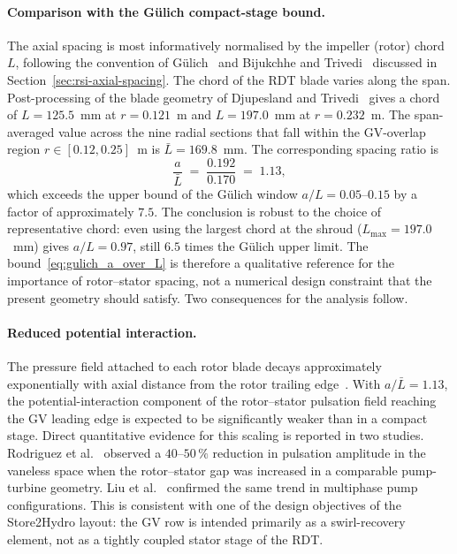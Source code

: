 \paragraph{Comparison with the G\"ulich compact-stage bound.}
The axial spacing is most informatively normalised by the impeller (rotor) chord $L$, following the convention of G\"ulich~\cite{Gulich2010} and Bijukchhe and Trivedi~\cite{Bijukchhe2026} discussed in Section~\ref{sec:rsi-axial-spacing}. The chord of the RDT blade varies along the span. Post-processing of the blade geometry of Djupesland and Trivedi~\cite{DjupeslandTrivedi2025} gives a chord of $L = 125.5$~mm at $r = 0.121$~m and $L = 197.0$~mm at $r = 0.232$~m. The span-averaged value across the nine radial sections that fall within the GV-overlap region $r \in [0.12, 0.25]$~m is $\bar{L} = 169.8$~mm. The corresponding spacing ratio is
\begin{equation}
    \frac{a}{\bar{L}} \;=\; \frac{0.192}{0.170} \;=\; 1.13,
    \label{eq:my_a_over_L}
\end{equation}
which exceeds the upper bound of the G\"ulich window $a/L = 0.05$--$0.15$ by a factor of approximately $7.5$. The conclusion is robust to the choice of representative chord: even using the largest chord at the shroud ($L_{\max} = 197.0$~mm) gives $a/L = 0.97$, still $6.5$ times the G\"ulich upper limit. The bound~\eqref{eq:gulich_a_over_L} is therefore a qualitative reference for the importance of rotor--stator spacing, not a numerical design constraint that the present geometry should satisfy. Two consequences for the analysis follow.

\paragraph{Reduced potential interaction.}
The pressure field attached to each rotor blade decays approximately exponentially with axial distance from the rotor trailing edge~\cite{Korakianitis1989,Hodson1989}. With $a/\bar{L} = 1.13$, the potential-interaction component of the rotor--stator pulsation field reaching the GV leading edge is expected to be significantly weaker than in a compact stage. Direct quantitative evidence for this scaling is reported in two studies. Rodriguez et al.~\cite{Rodriguez2007} observed a $40$--$50\,\%$ reduction in pulsation amplitude in the vaneless space when the rotor--stator gap was increased in a comparable pump-turbine geometry. Liu et al.~\cite{Liu2022GapMatching} confirmed the same trend in multiphase pump configurations. This is consistent with one of the design objectives of the Store2Hydro layout: the GV row is intended primarily as a swirl-recovery element, not as a tightly coupled stator stage of the RDT.

